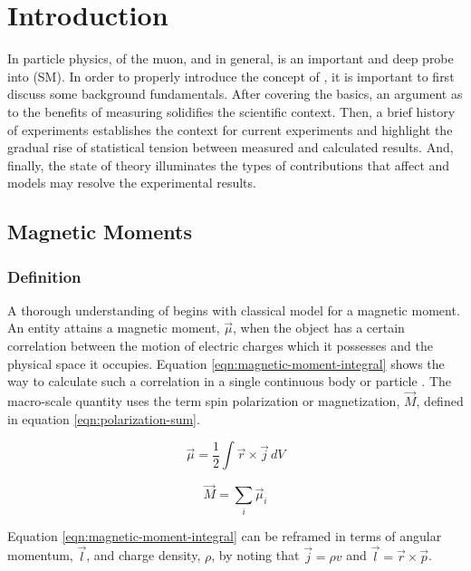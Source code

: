 \chapter {Introduction} \label{ch:intro}

In particle physics, \gmtwo of the muon, and \gmtwo in general, is an important and deep probe into \tsm (SM). In order to properly introduce the concept of \gmtwo, it is important to first discuss some background fundamentals.  After covering the basics, an argument as to the benefits of measuring \mugmtwo solidifies the scientific context. Then, a brief history of \mugmtwo experiments establishes the context for current \mugmtwo experiments and highlight the gradual rise of statistical tension between measured and calculated results.  And, finally, the state of theory illuminates the types of contributions that affect \mugmtwo and models may resolve the experimental results. 

\section{Magnetic Moments}

\subsection{Definition}
A thorough understanding of \gmtwo begins with classical model for a magnetic moment.  An entity attains a magnetic moment, $\vec{\mu}$, when the object has a certain correlation between the motion of electric charges which it possesses and the physical space it occupies.  Equation \ref{eqn:magnetic-moment-integral} shows the way to calculate such a correlation in a single continuous body or particle \cite{jackson}.  The macro-scale quantity uses the term spin polarization or magnetization, $\vec{M}$, defined in equation \ref{eqn:polarization-sum}.

\begin{equation}
\label{eqn:magnetic-moment-integral}
\vec{\mu} = \frac{1}{2} \int \vec{r} \times \vec{j} \,dV
\end{equation}

\begin{equation}
\label{eqn:polarization-sum}
\vec{M} = \sum_i \vec{\mu}_i
\end{equation}

\noindent
Equation \ref{eqn:magnetic-moment-integral} can be reframed in terms of angular momentum, $\vec{l}$, and charge density, $
\rho$, by noting that $\vec{j} = \rho v$ and $\vec{l} = \vec{r} \times \vec{p}$.


